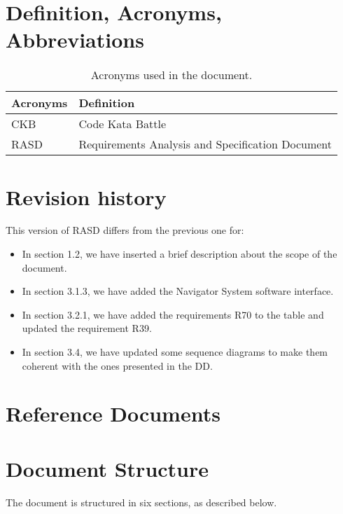 \section{Definition, Acronyms, Abbreviations}
\label{sec:definition_acronyms_abbreviations}%
\begin{table}[H]
    \begin{center}
        \begin{tabular}{ |l|l| }
            \hline
            \textbf{Acronyms} & \textbf{Definition}                              \\
            \hline
            CKB              & Code Kata Battle                      \\
            \hline
            RASD              & Requirements Analysis and Specification Document \\
            \hline
        \end{tabular}
        \caption{Acronyms used in the document.}
        \label{tab:acronyms}%
    \end{center}
\end{table}


\section{Revision history}
\label{sec:revision_history}%
This version of RASD differs from the previous one for:
\begin{itemize}
    \item In section 1.2, we have inserted a brief description about the scope of the document.
    \item In section 3.1.3, we have added the Navigator System software interface.
    \item In section 3.2.1, we have added the requirements R70 to the table and updated the requirement R39.
    \item In section 3.4, we have updated some sequence diagrams to make them coherent with the ones presented in the DD\@.
\end{itemize}


\section{Reference Documents}
\label{sec:reference_documents}%


\section{Document Structure}
\label{sec:document_structure}%
The document is structured in six sections, as described below.

